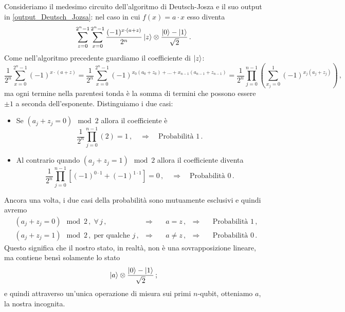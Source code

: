 \noindent Consideriamo il medesimo circuito dell'algoritmo di Deutsch-Josza e il suo output in \eqref{output_Deutsch_Jozsa}: nel caso in cui $f(x) = a \cdot x$ esso diventa 
\begin{equation*}
    \sum_{z=0}^{2^n-1}\sum_{x=0}^{2^n-1}\frac{(-1)^{x\cdot (a+z)}}{2^n}\ket z \otimes \frac{\ket 0 - \ket 1}{\sqrt 2} \, .
\end{equation*}
Come nell'algoritmo precedente guardiamo il coefficiente di $\ket{z}$:
\begin{equation*}
        \frac{1}{2^n} \sum_{x=0}^{2^n-1}(-1)^{x\cdot (a+z)} = \frac{1}{2^n} \sum_{x=0}^{2^n-1}(-1)^{x_0(a_0+z_0) + \ldots + x_{n-1}(a_{n-1}+z_{n-1})} = \frac{1}{2^n} \prod_{j=0}^{n-1} \left( \sum_{x_j=0}^{1}(-1)^{x_j(a_j+z_j)} \right) \, ,
\end{equation*}
ma ogni termine nella parentesi tonda è la somma di termini che possono essere $\pm 1$ a seconda dell'esponente. Distinguiamo i due casi:
\begin{itemize}
    \item Se $(a_j+z_j=0)\mod2 $ allora il coefficiente è 
    \begin{equation*}
        \frac{1}{2^n} \prod_{j=0}^{n-1}(2) = 1 \, , \quad \Rightarrow \quad \text{Probabilità } 1 \, .
    \end{equation*}
    \item Al contrario quando $(a_j+z_j=1)\mod2$ allora il coefficiente diventa 
    \begin{equation*}
        \frac{1}{2^n} \prod_{j=0}^{n-1} \left[ (-1)^{0\cdot 1} + (-1)^{1 \cdot 1} \right] = 0 \, , \quad \Rightarrow \quad \text{Probabilità } 0 \, .
    \end{equation*}
\end{itemize}
Ancora una volta, i due casi della probabilità sono mutuamente esclusivi e quindi avremo
\begin{align*}
    &(a_j+z_j=0)\mod2 \, , \; \forall \, j \, ,  &\Rightarrow& \quad a = z \, , &\Rightarrow& \quad \text{Probabilità } 1 \, , \\
    &(a_j+z_j=1)\mod2 \, , \;  \text{per qualche } j \, , &\Rightarrow& \quad a \neq z \, , &\Rightarrow& \quad \text{Probabilità } 0 \, .
\end{align*}
Questo significa che il nostro stato, in realtà, non è una sovrapposizione lineare, ma contiene bensì solamente lo stato
\begin{equation*}
    \ket a \otimes \frac{\ket 0 - \ket 1}{\sqrt 2} \, ;
\end{equation*}
e quindi attraverso un'unica operazione di misura sui primi $n$-qubit, otteniamo $a$, la nostra incognita.
